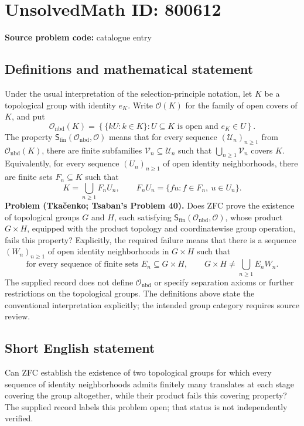 \documentclass[11pt]{article}
\begin{document}
\section*{UnsolvedMath ID: 800612}
\textbf{Source problem code:} catalogue entry
\subsection{Definitions and mathematical statement}
Under the usual interpretation of the selection-principle notation, let \(K\) be a topological group with identity \(e_K\). Write \(\mathcal O(K)\) for the family of open covers of \(K\), and put
\[
\mathcal O_{\mathrm{nbd}}(K)=\left\{\{kU:k\in K\}: U\subseteq K\text{ is open and }e_K\in U\right\}.
\]
The property \(\mathsf S_{\mathrm{fin}}(\mathcal O_{\mathrm{nbd}},\mathcal O)\) means that for every sequence \((\mathcal U_n)_{n\geq 1}\) from \(\mathcal O_{\mathrm{nbd}}(K)\), there are finite subfamilies \(\mathcal V_n\subseteq\mathcal U_n\) such that \(\bigcup_{n\geq 1}\mathcal V_n\) covers \(K\). Equivalently, for every sequence \((U_n)_{n\geq 1}\) of open identity neighborhoods, there are finite sets \(F_n\subseteq K\) such that
\[
K=\bigcup_{n\geq 1}F_nU_n,
\qquad F_nU_n=\{fu:f\in F_n,\ u\in U_n\}.
\]
\textbf{Problem (Tka\v{c}enko; Tsaban's Problem 40).} Does ZFC prove the existence of topological groups \(G\) and \(H\), each satisfying \(\mathsf S_{\mathrm{fin}}(\mathcal O_{\mathrm{nbd}},\mathcal O)\), whose product \(G\times H\), equipped with the product topology and coordinatewise group operation, fails this property? Explicitly, the required failure means that there is a sequence \((W_n)_{n\geq 1}\) of open identity neighborhoods in \(G\times H\) such that
\[
\text{for every sequence of finite sets }E_n\subseteq G\times H,
\qquad G\times H\ne\bigcup_{n\geq 1}E_nW_n.
\]
The supplied record does not define \(\mathcal O_{\mathrm{nbd}}\) or specify separation axioms or further restrictions on the topological groups. The definitions above state the conventional interpretation explicitly; the intended group category requires source review.
\subsection{Short English statement}
Can ZFC establish the existence of two topological groups for which every sequence of identity neighborhoods admits finitely many translates at each stage covering the group altogether, while their product fails this covering property? The supplied record labels this problem open; that status is not independently verified.
\end{document}
